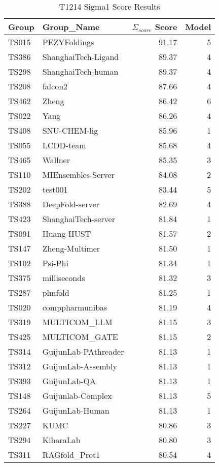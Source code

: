 \begin{table*}[ht]
\caption{T1214 Sigma1 Score Results}
\label{tab:T1214_Sigma_score_split}
\scriptsize
\begin{minipage}[t]{0.48\textwidth}
\centering
\begin{tabular}{llrr}
\toprule
Group & Group\_Name & $\Sigma_{score}$ Score & Model \\ 
\midrule
TS015 & PEZYFoldings & 91.17 & 5 \\ 
TS386 & ShanghaiTech-Ligand & 89.37 & 4 \\ 
TS298 & ShanghaiTech-human & 89.37 & 4 \\ 
TS208 & falcon2 & 87.66 & 4 \\ 
TS462 & Zheng & 86.42 & 6 \\ 
TS022 & Yang & 86.26 & 4 \\ 
TS408 & SNU-CHEM-lig & 85.96 & 1 \\ 
TS055 & LCDD-team & 85.68 & 4 \\ 
TS465 & Wallner & 85.35 & 3 \\ 
TS110 & MIEnsembles-Server & 84.08 & 2 \\ 
TS202 & test001 & 83.44 & 5 \\ 
TS388 & DeepFold-server & 82.69 & 4 \\ 
TS423 & ShanghaiTech-server & 81.84 & 1 \\ 
TS091 & Huang-HUST & 81.57 & 2 \\ 
TS147 & Zheng-Multimer & 81.50 & 1 \\ 
TS102 & Psi-Phi & 81.34 & 1 \\ 
TS375 & milliseconds & 81.32 & 3 \\ 
TS287 & plmfold & 81.25 & 1 \\ 
TS020 & comppharmunibas & 81.19 & 4 \\ 
TS319 & MULTICOM\_LLM & 81.15 & 3 \\ 
TS425 & MULTICOM\_GATE & 81.15 & 2 \\ 
TS314 & GuijunLab-PAthreader & 81.13 & 1 \\ 
TS312 & GuijunLab-Assembly & 81.13 & 1 \\ 
TS393 & GuijunLab-QA & 81.13 & 1 \\ 
TS148 & Guijunlab-Complex & 81.13 & 5 \\ 
TS264 & GuijunLab-Human & 81.13 & 1 \\ 
TS227 & KUMC & 80.86 & 3 \\ 
TS294 & KiharaLab & 80.80 & 3 \\ 
TS311 & RAGfold\_Prot1 & 80.54 & 4 \\ 

\end{tabular}
\end{minipage}
\end{table*}
